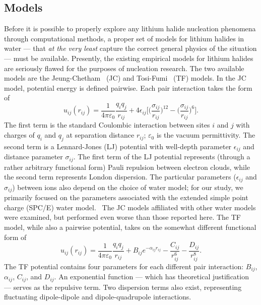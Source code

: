 \documentclass[titlepage,11pt]{article}
\begin{document}
\subsection{Models}

Before it is possible to properly explore any lithium halide nucleation phenomena through computational methods, a proper set of models for lithium halides in water --- that \textit{at the very least} capture the correct general physics of the situation --- must be available. Presently, the existing empirical models for lithium halides are seriously flawed for the purposes of nucleation research. The two available models are the Jeung-Chetham~\cite{Joung2008} (JC) and Tosi-Fumi~\cite{Tosi1964} (TF) models. In the JC model, potential energy is defined pairwise. Each pair interaction takes the form of
\begin{equation}
u_{ij} (r_{ij}) = \frac{1}{4 \pi \varepsilon_{0}}\frac{q_{i} q_{j} }{r_{ij}} + 4 \epsilon_{ij} \bigg[ \big(\frac{\sigma_{ij}}{r_{ij}} \big)^{12} - \big(\frac{\sigma_{ij}}{r_{ij}} \big)^{6} \bigg].
\end{equation}
The first term is the standard Coulombic interaction between sites $i$ and $j$ with charges of $q_{i}$ and $q_{j}$ at separation distance $r_{ij}$; $\varepsilon_{0}$ is the vacuum permittivity. The second term is a Lennard-Jones  (LJ) potential with well-depth parameter $\epsilon_{ij}$ and distance parameter $\sigma_{ij}$. The first term of the LJ potential represents (through a rather arbitrary functional form) Pauli repulsion between electron clouds, while the second term represents London dispersion. The particular parameters ($\epsilon_{ij}$ and $\sigma_{ij}$) between ions also depend on the choice of water model; for our study, we primarily focused on the parameters associated with the extended simple point charge (SPC/E) water model.~\cite{berendsen1987missing} The JC models affiliated with other water models were examined, but performed even worse than those reported here. The TF model, while also a pairwise potential, takes on the somewhat different functional form of
\begin{equation}
	u_{ij} (r_{ij}) = \frac{1}{4 \pi \varepsilon_{0}}\frac{q_{i} q_{j} }{r_{ij}} + B_{ij} e^{-\alpha_{ij}r_{ij}} - \frac{C_{ij}}{r_{ij}^{6}} - \frac{D_{ij}}{r_{ij}^{8}}.
\end{equation}
The TF potential contains four parameters for each different pair interaction: $B_{ij}$, $\alpha_{ij}$, $C_{ij}$, and $D_{ij}$. An exponential function --- which has theoretical justification~\cite{Slater1928} --- serves as the repulsive term. Two dispersion terms also exist, representing fluctuating dipole-dipole and dipole-quadrupole interactions.
 
\end{document}
